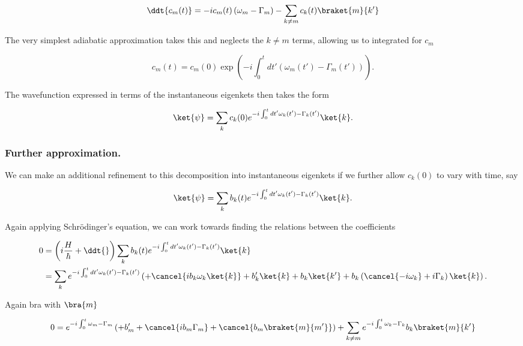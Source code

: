 \begin{equation}\label{eqn:qmTwoExamReflection:470}
\ddt{c_m(t)} 
=
-i c_m(t) 
\left( \omega_m - \Gamma_m \right)
- 
\sum_{k \ne m}
c_k(t) \braket{m}{k'} 
\end{equation}

The very simplest adiabatic approximation takes this and neglects the $k \ne m$ terms, allowing us to integrated for $c_m$

\begin{equation}\label{eqn:qmTwoExamReflection:490}
c_m(t)
=
c_m(0) \exp\left( -i \int_0^t dt' \left( \omega_m(t') - \Gamma_m(t') \right) \right).
\end{equation}

The wavefunction expressed in terms of the instantaneous eigenkets then takes the form

\begin{equation}\label{eqn:qmTwoExamReflection:510}
\ket{\psi}
=
\sum_k c_k(0) e^{-i \int_0^t dt' \omega_k(t') - \Gamma_k(t') } \ket{k}.
\end{equation}

\subsubsection{Further approximation.}
We can make an additional refinement to this decomposition into instantaneous eigenkets if we further allow $c_k(0)$ to vary with time, say

\begin{equation}\label{eqn:qmTwoExamReflection:530}
\ket{\psi}
=
\sum_k b_k(t) e^{-i \int_0^t dt' \omega_k(t') - \Gamma_k(t') } \ket{k}.
\end{equation}

Again applying Schr\"{o}dinger's equation, we can work towards finding the relations between the coefficients

\begin{align*}
0 
&=
\left( i\frac{H}{\hbar} + \ddt{} \right)
\sum_k b_k(t) e^{-i \int_0^t dt' \omega_k(t') - \Gamma_k(t') } \ket{k} 
\\
&=
\sum_k e^{-i \int_0^t dt' \omega_k(t') - \Gamma_k(t') } 
\left(
+ \cancel{i b_k \omega_k \ket{k} }
+ b_k' \ket{k} 
+ b_k \ket{k'} 
+ b_k \left( \cancel{-i \omega_k} +i \Gamma_k \right) \ket{k} 
\right).
\end{align*}

Again bra with $\bra{m}$

\begin{align*}
0 
=
e^{-i \int_0^t  \omega_m - \Gamma_m } 
\left(
+ b_m' 
+ \cancel{i b_m \Gamma_m }
+ \cancel{b_m \braket{m}{m'} }
\right)
+\sum_{k\ne m} e^{-i \int_0^t  \omega_k - \Gamma_k } b_k \braket{m}{k'} 
\end{align*}

